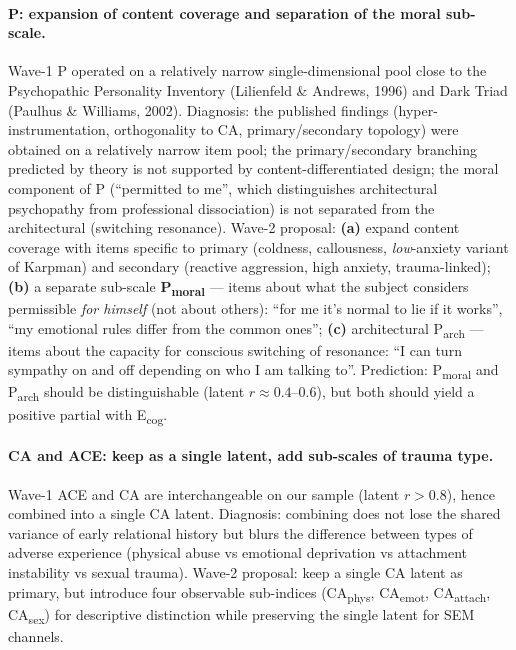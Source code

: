 \paragraph{P: expansion of content coverage and separation of the moral sub-scale.} Wave-1 P operated on a relatively narrow single-dimensional pool close to the Psychopathic Personality Inventory (Lilienfeld \& Andrews, 1996) and Dark Triad (Paulhus \& Williams, 2002). Diagnosis: the published findings (hyper-instrumentation, orthogonality to CA, primary/secondary topology) were obtained on a relatively narrow item pool; the primary/secondary branching predicted by theory is not supported by content-differentiated design; the moral component of P (``permitted to me'', which distinguishes architectural psychopathy from professional dissociation) is not separated from the architectural (switching resonance). Wave-2 proposal: \textbf{(a)} expand content coverage with items specific to primary (coldness, callousness, \emph{low}-anxiety variant of Karpman) and secondary (reactive aggression, high anxiety, trauma-linked); \textbf{(b)} a separate sub-scale \textbf{P\textsubscript{moral}} --- items about what the subject considers permissible \emph{for himself} (not about others): ``for me it's normal to lie if it works'', ``my emotional rules differ from the common ones''; \textbf{(c)} architectural P\textsubscript{arch} --- items about the capacity for conscious switching of resonance: ``I can turn sympathy on and off depending on who I am talking to''. Prediction: P\textsubscript{moral} and P\textsubscript{arch} should be distinguishable (latent $r \approx 0.4$--$0.6$), but both should yield a positive partial with E\textsubscript{cog}.

\paragraph{CA and ACE: keep as a single latent, add sub-scales of trauma type.} Wave-1 ACE and CA are interchangeable on our sample (latent $r > 0.8$), hence combined into a single CA latent. Diagnosis: combining does not lose the shared variance of early relational history but blurs the difference between types of adverse experience (physical abuse vs emotional deprivation vs attachment instability vs sexual trauma). Wave-2 proposal: keep a single CA latent as primary, but introduce four observable sub-indices (CA\textsubscript{phys}, CA\textsubscript{emot}, CA\textsubscript{attach}, CA\textsubscript{sex}) for descriptive distinction while preserving the single latent for SEM channels.

